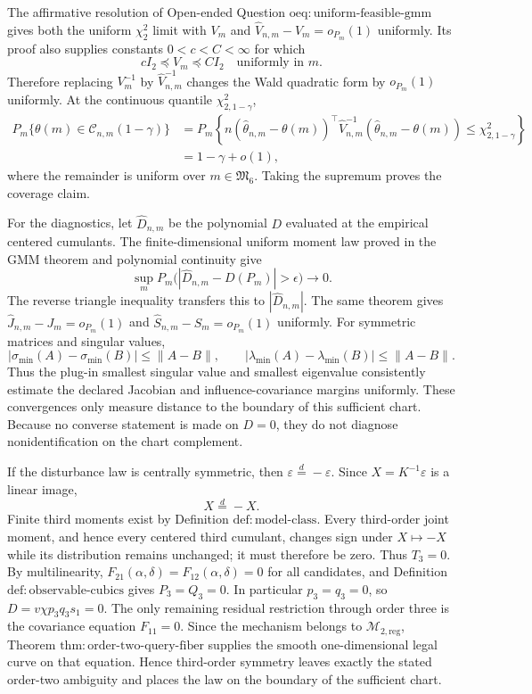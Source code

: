 The affirmative resolution of Open-ended Question \(\mathrm{oeq:uniform\mbox{-}feasible\mbox{-}gmm}\) gives both the uniform \(\chi^2_2\) limit with \(V_m\) and \(\widehat V_{n,m}-V_m=o_{P_m}(1)\) uniformly. Its proof also supplies constants \(0<c<C<\infty\) for which
\[
cI_2\preceq V_m\preceq CI_2
\quad\text{uniformly in }m.
\]
Therefore replacing \(V_m^{-1}\) by \(\widehat V_{n,m}^{-1}\) changes the Wald quadratic form by \(o_{P_m}(1)\) uniformly. At the continuous quantile \(\chi^2_{2,1-\gamma}\),
\[
\begin{aligned}
P_m\{\theta(m)\in\mathcal C_{n,m}(1-\gamma)\}
&=P_m\!\left\{n(\widehat\theta_{n,m}-\theta(m))^\top
\widehat V_{n,m}^{-1}(\widehat\theta_{n,m}-\theta(m))
\le\chi^2_{2,1-\gamma}\right\}\\
&=1-\gamma+o(1),
\end{aligned}
\]
where the remainder is uniform over \(m\in\mathfrak M_6\). Taking the supremum proves the coverage claim.

For the diagnostics, let \(\widehat D_{n,m}\) be the polynomial \(D\) evaluated at the empirical centered cumulants. The finite-dimensional uniform moment law proved in the GMM theorem and polynomial continuity give
\[
\sup_mP_m\bigl(|\widehat D_{n,m}-D(P_m)|>\epsilon\bigr)\to0.
\]
The reverse triangle inequality transfers this to \(|\widehat D_{n,m}|\). The same theorem gives \(\widehat J_{n,m}-J_m=o_{P_m}(1)\) and \(\widehat S_{n,m}-S_m=o_{P_m}(1)\) uniformly. For symmetric matrices and singular values,
\[
|\sigma_{\min}(A)-\sigma_{\min}(B)|\le\|A-B\|,
\qquad
|\lambda_{\min}(A)-\lambda_{\min}(B)|\le\|A-B\|.
\]
Thus the plug-in smallest singular value and smallest eigenvalue consistently estimate the declared Jacobian and influence-covariance margins uniformly. These convergences only measure distance to the boundary of this sufficient chart. Because no converse statement is made on \(D=0\), they do not diagnose nonidentification on the chart complement.

If the disturbance law is centrally symmetric, then \(\varepsilon\stackrel{d}{=}-\varepsilon\). Since \(X=K^{-1}\varepsilon\) is a linear image,
\[
X\stackrel{d}{=}-X.
\]
Finite third moments exist by Definition \(\mathrm{def:model\mbox{-}class}\). Every third-order joint moment, and hence every centered third cumulant, changes sign under \(X\mapsto-X\) while its distribution remains unchanged; it must therefore be zero. Thus \(T_3=0\). By multilinearity, \(F_{21}(\alpha,\delta)=F_{12}(\alpha,\delta)=0\) for all candidates, and Definition \(\mathrm{def:observable\mbox{-}cubics}\) gives \(P_3=Q_3=0\). In particular \(p_3=q_3=0\), so \(D=v\chi p_3q_3s_1=0\). The only remaining residual restriction through order three is the covariance equation \(F_{11}=0\). Since the mechanism belongs to \(\mathcal M_{2,\mathrm{reg}}\), Theorem \(\mathrm{thm:order\mbox{-}two\mbox{-}query\mbox{-}fiber}\) supplies the smooth one-dimensional legal curve on that equation. Hence third-order symmetry leaves exactly the stated order-two ambiguity and places the law on the boundary of the sufficient chart.
